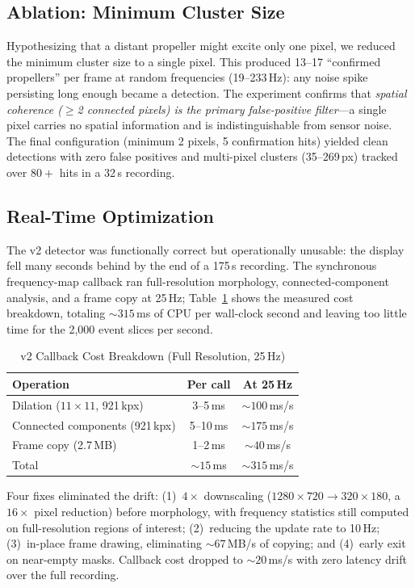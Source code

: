 \documentclass[conference]{IEEEtran}
\begin{document}
\subsection{Ablation: Minimum Cluster Size}
Hypothesizing that a distant propeller might excite only one pixel, we
reduced the minimum cluster size to a single pixel. This produced 13--17
``confirmed propellers'' per frame at random frequencies (19--233\,Hz):
any noise spike persisting long enough became a detection. The
experiment confirms that \emph{spatial coherence ($\ge$2 connected
pixels) is the primary false-positive filter}---a single pixel carries no
spatial information and is indistinguishable from sensor noise. The
final configuration (minimum 2 pixels, 5 confirmation hits) yielded
clean detections with zero false positives and multi-pixel clusters
(35--269\,px) tracked over $80{+}$ hits in a 32\,s recording.

\subsection{Real-Time Optimization}
\label{sec:latency}
The v2 detector was functionally correct but operationally unusable: the
display fell many seconds behind by the end of a 175\,s recording. The
synchronous frequency-map callback ran full-resolution morphology,
connected-component analysis, and a frame copy at 25\,Hz;
Table~\ref{tab:cost} shows the measured cost breakdown, totaling
${\sim}315$\,ms of CPU per wall-clock second and leaving too little time
for the 2{,}000 event slices per second.

\begin{table}[t]
\caption{v2 Callback Cost Breakdown (Full Resolution, 25\,Hz)}
\label{tab:cost}
\centering
\begin{tabular}{@{}lcc@{}}
\toprule
\textbf{Operation} & \textbf{Per call} & \textbf{At 25\,Hz} \\
\midrule
Dilation ($11\times11$, 921\,kpx) & 3--5\,ms & ${\sim}100$\,ms/s \\
Connected components (921\,kpx) & 5--10\,ms & ${\sim}175$\,ms/s \\
Frame copy (2.7\,MB) & 1--2\,ms & ${\sim}40$\,ms/s \\
\midrule
Total & ${\sim}15$\,ms & ${\sim}315$\,ms/s \\
\bottomrule
\end{tabular}
\end{table}

Four fixes eliminated the drift: (1)~$4\times$ downscaling
($1280\times720 \to 320\times180$, a $16\times$ pixel reduction) before
morphology, with frequency statistics still computed on full-resolution
regions of interest; (2)~reducing the update rate to 10\,Hz;
(3)~in-place frame drawing, eliminating ${\sim}67$\,MB/s of copying; and
(4)~early exit on near-empty masks. Callback cost dropped to
${\sim}20$\,ms/s with zero latency drift over the full recording.
\end{document}
